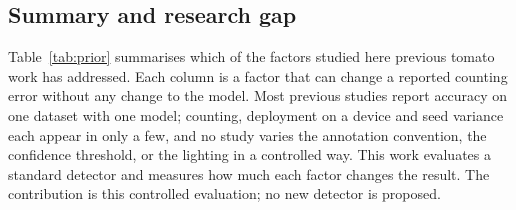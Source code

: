 \subsection{Summary and research gap}

Table~\ref{tab:prior} summarises which of the factors studied here previous
tomato work has addressed. Each column is a factor that can change a reported
counting error without any change to the model. Most previous studies report
accuracy on one dataset with one model; counting, deployment on a device and
seed variance each appear in only a few, and no study varies the annotation
convention, the confidence threshold, or the lighting in a controlled way. This
work evaluates a standard detector and measures how much each factor changes
the result. The contribution is this controlled evaluation; no new detector is
proposed.

